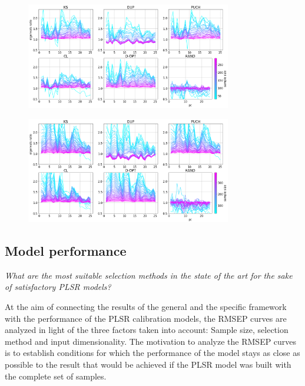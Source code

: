 \documentclass[journal=ancham,manuscript=article]{achemso}
\begin{document}
\begin{figure}[b]
\includegraphics[width=0.8\textwidth]{manuscript/figures/d01_milk_specific_framework_eigenvalsratio.png}
\centering
\caption{}
\label{fig_d01_milk_specific_framework_eigenvalsratio}
\end{figure}

\begin{figure}[b]
\includegraphics[width=0.8\textwidth]{manuscript/figures/d02_manure_specific_framework_eigenvalsratio.png}
\centering
\caption{}
\label{fig_d02_manure_specific_framework_eigenvalsratio}
\end{figure}

\subsection*{Model performance}\label{results:modperformance}


\emph{What are the most suitable selection methods in the state of the art for the sake of satisfactory PLSR models?}

At the aim of connecting the results of the general and the specific framework with the performance of the PLSR calibration models, the RMSEP curves are analyzed in light of the three factors taken into account: Sample size, selection method and input dimensionality. The motivation to analyze the RMSEP curves is to establish conditions for which the performance of the model stays as close as possible to the result that would be achieved if the PLSR model was built with the complete set of samples. 
\end{document}
